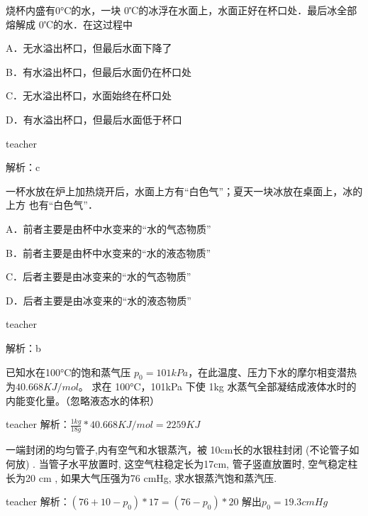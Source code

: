 \begin{example}
	烧杯内盛有$0\si{\degreeCelsius}$的水，一块 0℃的冰浮在水面上，水面正好在杯口处．最后冰全部熔解成 0℃的水．在这过程中
	
	 A．无水溢出杯口，但最后水面下降了 
	 
	 B．有水溢出杯口，但最后水面仍在杯口处 
	 
	 C．无水溢出杯口，水面始终在杯口处 
	 
	 D．有水溢出杯口，但最后水面低于杯口
	\begin{taggedblock}{teacher}
		
		解析：c
	\end{taggedblock}
\end{example}


\begin{example}
	一杯水放在炉上加热烧开后，水面上方有“白色气”；夏天一块冰放在桌面上，冰的上方 也有“白色气”． 
	
	A．前者主要是由杯中水变来的“水的气态物质”
	
	B．前者主要是由杯中水变来的“水的液态物质”
	
	C．后者主要是由冰变来的“水的气态物质”
	
	 D．后者主要是由冰变来的“水的液态物质”
	\begin{taggedblock}{teacher}
		
		解析：b
	\end{taggedblock}
\end{example}

\begin{example}
已知水在100\si{\degreeCelsius}的饱和蒸气压 $p_0=101\si{kPa}$，在此温度、压力下水的摩尔相变潜热为$ 40.668\si{KJ/mol}$。 求在 100\si{\degreeCelsius}，101\si{ kPa} 下使 1\si{ kg} 水蒸气全部凝结成液体水时的内能变化量。（忽略液态水的体积）
\begin{taggedblock}{teacher}
\newline
解析：$\frac{1\si{kg}}{18\si{g}}*40.668\si{KJ/mol}=2259\si{KJ}$
\end{taggedblock}
\end{example}

\begin{example}
	一端封闭的均匀管子,内有空气和水银蒸汽，被 10cm长的水银柱封闭 (不论管子如何放) . 当管子水平放置时, 这空气柱稳定长为17cm, 管子竖直放置时, 空气稳定柱长为20 cm , 如果大气压强为76 cmHg, 求水银蒸汽饱和蒸汽压.
	\begin{taggedblock}{teacher}
		\newline
		解析：$(76+10-p_0)*17=(76-p_0)*20$   解出$p_0=19.3cmHg$
	\end{taggedblock}
\end{example}



